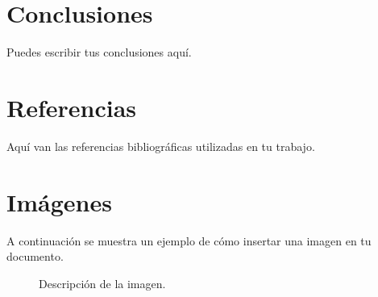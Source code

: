 \documentclass{article}
\begin{document}
\section{Conclusiones}
Puedes escribir tus conclusiones aquí.

\section{Referencias}
Aquí van las referencias bibliográficas utilizadas en tu trabajo.

\section{Imágenes}
A continuación se muestra un ejemplo de cómo insertar una imagen en tu documento.

\begin{figure}[h]
\centering
\caption{Descripción de la imagen.}
\label{fig:ejemplo}
\end{figure}
\end{document}
